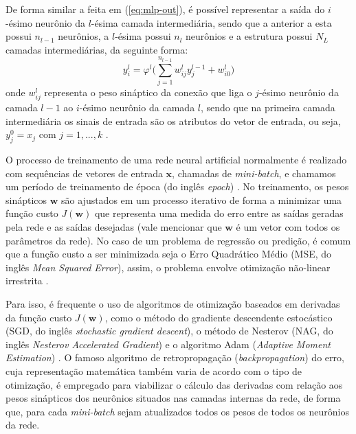 \documentclass[a4paper, 12pt]{article}
\begin{document}
De forma similar a feita em (\ref{eq:mlp-out}), é possível representar a saída do $i$-ésimo neurônio da $l$-ésima camada intermediária, sendo que a anterior a esta possui $n_{l-1}$ neurônios, a $l$-ésima possui $n_l$ neurônios e a estrutura possui $N_L$ camadas intermediárias, da seguinte forma:
\begin{equation}
	y_{i}^{l} = \varphi^{l} \Big(\sum_{j=1}^{n_{l-1}} w_{ij}^{l} y_{j}^{l-1} + w_{i0}^{l} \Big)
\end{equation}
onde $w_{ij}^{l}$ representa o peso sináptico da conexão que liga o $j$-ésimo neurônio da camada $l-1$ ao $i$-ésimo neurônio da camada $l$, sendo que na primeira camada intermediária os sinais de entrada são os atributos do vetor de entrada, ou seja, $y_{j}^{0} = x_{j}$ com $j = 1, ..., k$ \cite{boccato2013novas}.

O processo de treinamento de uma rede neural artificial normalmente é realizado com sequências de vetores de entrada $\mathbf{x}$, chamadas de \textit{mini-batch}, e chamamos um período de treinamento de época (do inglês \textit{epoch}) \cite{geron2019hands}. No treinamento, os pesos sinápticos $\mathbf{w}$ são ajustados em um processo iterativo de forma a minimizar uma função custo $J(\mathbf{w})$ que representa uma medida do erro entre as saídas geradas pela rede e as saídas desejadas (vale mencionar que $\mathbf{w}$ é um vetor com todos os parâmetros da rede). No caso de um problema de regressão ou predição, é comum que a função custo a ser minimizada seja o Erro Quadrático Médio (MSE, do inglês \textit{Mean Squared Error}), assim, o problema envolve otimização não-linear irrestrita \cite{haykin2010neural}.

Para isso, é frequente o uso de algoritmos de otimização baseados em derivadas da função custo $J(\mathbf{w})$, como o método do gradiente descendente estocástico (SGD, do inglês \textit{stochastic gradient descent}), o método de Nesterov (NAG, do inglês \textit{Nesterov Accelerated Gradient}) e o algoritmo Adam (\textit{Adaptive Moment Estimation}) \cite{geron2019hands}. O famoso algoritmo de retropropagação (\textit{backpropagation}) do erro, cuja representação matemática também varia de acordo com o tipo de otimização, é empregado para viabilizar o cálculo das derivadas com relação aos pesos sinápticos dos neurônios situados nas camadas internas da rede, de forma que, para cada \textit{mini-batch} sejam atualizados todos os pesos de todos os neurônios da rede. 
\end{document}
